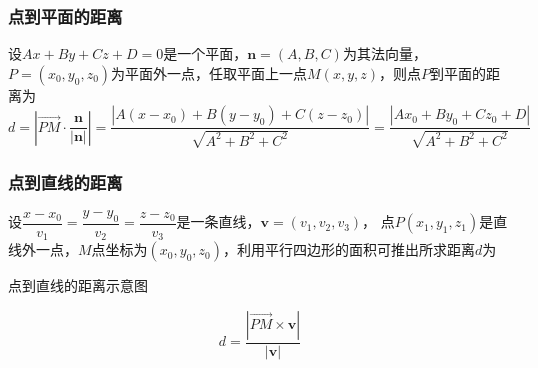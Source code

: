 \subsubsection{点到平面的距离}
设$Ax+By+Cz+D=0$是一个平面，$\bm{n}=(A,B,C)$为其法向量，$P=(x_0,y_0,z_0)$为平面外一点，任取平面上一点$M(x,y,z)$，则点$P$到平面的距离为
\begin{equation}
    \label{eq:点到平面的距离公式}
    d = \left\lvert \overrightarrow{PM}\cdot\frac{\bm{n}}{|\bm{n}|}\right\rvert
    = \frac{|A(x-x_0) + B(y-y_0) + C(z-z_0)|}{\sqrt{A^2+B^2+C^2}}
    = \frac{|Ax_0+By_0+Cz_0+D|}{\sqrt{A^2+B^2+C^2}}
\end{equation}

\subsubsection{点到直线的距离}
设$\dfrac{x-x_0}{v_1} = \dfrac{y-y_0}{v_2} = \dfrac{z-z_0}{v_3}$是一条直线，$\bm{v}=(v_1,v_2,v_3)$，
点$P(x_1,y_1,z_1)$是直线外一点，$M$点坐标为$(x_0,y_0,z_0)$，利用平行四边形的面积可推出所求距离$d$为
\begin{marginfigure}
    \centering
    \caption{点到直线的距离示意图}
\end{marginfigure}
\begin{equation}
    \label{eq:点到直线的距离公式}
    d = \frac{\left\lvert \overrightarrow{PM}\times\bm{v}\right\rvert}{|\bm{v}|}
\end{equation}

